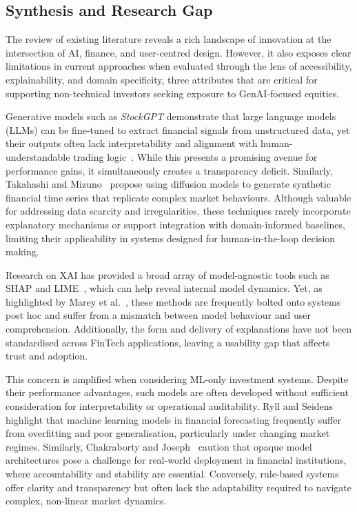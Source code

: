\subsection{Synthesis and Research Gap}

The review of existing literature reveals a rich landscape of innovation at the intersection of AI, finance, and user-centred design. However, it also exposes clear limitations in current approaches when evaluated through the lens of accessibility, explainability, and domain specificity, three attributes that are critical for supporting non-technical investors seeking exposure to GenAI-focused equities.

Generative models such as \textit{StockGPT} demonstrate that large language models (LLMs) can be fine-tuned to extract financial signals from unstructured data, yet their outputs often lack interpretability and alignment with human-understandable trading logic~\cite{mai2024stockgpt}. While this presents a promising avenue for performance gains, it simultaneously creates a transparency deficit. Similarly, Takahashi and Mizuno~\cite{takahashi2024synthetic} propose using diffusion models to generate synthetic financial time series that replicate complex market behaviours. Although valuable for addressing data scarcity and irregularities, these techniques rarely incorporate explanatory mechanisms or support integration with domain-informed baselines, limiting their applicability in systems designed for human-in-the-loop decision making.

Research on XAI has provided a broad array of model-agnostic tools such as SHAP and LIME~\cite{ribeiro2016lime}, which can help reveal internal model dynamics. Yet, as highlighted by Marey et al.~\cite{marey2024xai}, these methods are frequently bolted onto systems post hoc and suffer from a mismatch between model behaviour and user comprehension. Additionally, the form and delivery of explanations have not been standardised across FinTech applications, leaving a usability gap that affects trust and adoption.

This concern is amplified when considering ML-only investment systems. Despite their performance advantages, such models are often developed without sufficient consideration for interpretability or operational auditability. Ryll and Seidens~\cite{ryll2019mlsurvey} highlight that machine learning models in financial forecasting frequently suffer from overfitting and poor generalisation, particularly under changing market regimes. Similarly, Chakraborty and Joseph~\cite{chakraborty2017boe} caution that opaque model architectures pose a challenge for real-world deployment in financial institutions, where accountability and stability are essential. Conversely, rule-based systems offer clarity and transparency but often lack the adaptability required to navigate complex, non-linear market dynamics.

